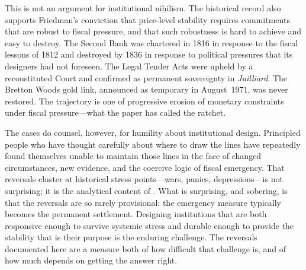 \documentclass[12pt]{article}
\begin{document}
This is not an argument for institutional nihilism.  The historical
record also supports Friedman's conviction that price-level stability
requires commitments that are robust to fiscal pressure, and that such
robustness is hard to achieve and easy to destroy.  The Second Bank was
chartered in 1816 in response to the fiscal lessons of 1812 and
destroyed by 1836 in response to political pressures that its designers
had not foreseen.  The Legal Tender Acts were upheld by a reconstituted
Court and confirmed as permanent sovereignty in \textit{Juilliard}.  The
Bretton Woods gold link, announced as temporary in August~1971, was never
restored.  The trajectory is one of progressive erosion of monetary
constraints under fiscal pressure---what the paper has called the ratchet.

The cases do counsel, however, for humility about institutional design.
Principled people who have thought carefully about where to draw the
lines have repeatedly found themselves unable to maintain those lines in
the face of changed circumstances, new evidence, and the coercive logic
of fiscal emergency.  That reversals cluster at historical stress
points---wars, panics, depressions---is not surprising; it is the
analytical content of \citet{SargentWallace1981}.  What is surprising,
and sobering, is that the reversals are so rarely provisional: the
emergency measure typically becomes the permanent settlement.  Designing
institutions that are both responsive enough to survive systemic stress
and durable enough to provide the stability that is their purpose is the
enduring challenge.  The reversals documented here are a measure both of
how difficult that challenge is, and of how much depends on getting the
answer right.

\bigskip



\end{document}
